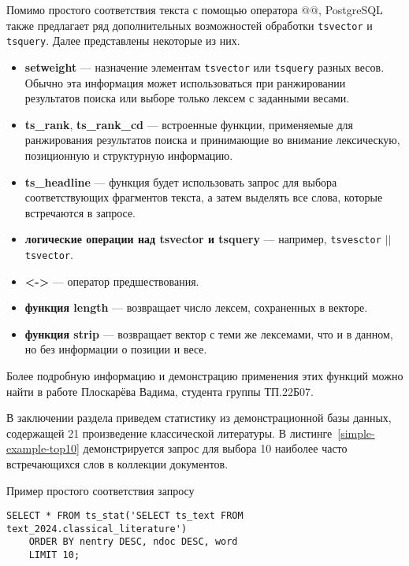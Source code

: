 Помимо простого соответствия текста с помощью оператора $@@$, PostgreSQL также предлагает ряд дополнительных возможностей обработки \texttt{tsvector} и \texttt{tsquery}.
Далее представлены некоторые из них.
\begin{itemize}
    \item{\textbf{setweight}} --- назначение элементам \texttt{tsvector} или \texttt{tsquery} разных весов.
          Обычно эта информация может использоваться при ранжировании результатов поиска или выборе только лексем с заданными весами.
    \item{\textbf{ts\_rank}, \textbf{ts\_rank\_cd}} --- встроенные функции, применяемые для ранжирования результатов поиска и принимающие во внимание лексическую, позиционную и структурную информацию.
    \item{\textbf{ts\_headline}} --- функция будет использовать запрос для выбора соответствующих фрагментов текста, а затем выделять все слова, которые встречаются в запросе.
    \item{\textbf{логические операции над {tsvector} и tsquery}} --- например, \texttt{tsvesctor} $||$ \texttt{tsvector}.
    \item{\textbf{<->}} --- оператор предшествования.
    \item{\textbf{функция length}} --- возвращает число лексем, сохраненных в векторе.
    \item{\textbf{функция strip}} --- возвращает вектор с теми же лексемами, что и в данном, но без информации о позиции и весе.
\end{itemize}

\noindent Более подробную информацию и демонстрацию применения этих функций можно найти в работе Плоскарёва Вадима, студента группы ТП.22Б07.

В заключении раздела приведем статистику из демонстрационной базы данных, содержащей 21 произведение классической литературы.
В листинге~\ref{simple-example-top10} демонстрируется запрос для выбора 10 наиболее часто встречающихся слов в коллекции документов.

\begin{algorithm}
    \caption{Пример простого соответствия запросу}
    \label{simple-example-top10}
    \begin{lstlisting}[style=codelistingstyle]
    SELECT * FROM ts_stat('SELECT ts_text FROM text_2024.classical_literature')
    ORDER BY nentry DESC, ndoc DESC, word
    LIMIT 10;
\end{lstlisting}
\end{algorithm}

